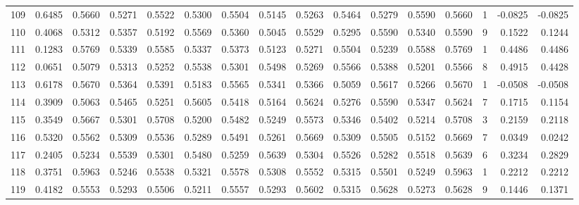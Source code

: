 \begin{tabular}{lrrrrrrrrrrrrrrr}
109 &      0.6485 &  0.5660 &  0.5271 &  0.5522 &  0.5300 &  0.5504 &  0.5145 &  0.5263 &  0.5464 &  0.5279 &   0.5590 &     0.5660 &      1 &                   -0.0825 &                    -0.0825 \\
110 &      0.4068 &  0.5312 &  0.5357 &  0.5192 &  0.5569 &  0.5360 &  0.5045 &  0.5529 &  0.5295 &  0.5590 &   0.5340 &     0.5590 &      9 &                    0.1522 &                     0.1244 \\
111 &      0.1283 &  0.5769 &  0.5339 &  0.5585 &  0.5337 &  0.5373 &  0.5123 &  0.5271 &  0.5504 &  0.5239 &   0.5588 &     0.5769 &      1 &                    0.4486 &                     0.4486 \\
112 &      0.0651 &  0.5079 &  0.5313 &  0.5252 &  0.5538 &  0.5301 &  0.5498 &  0.5269 &  0.5566 &  0.5388 &   0.5201 &     0.5566 &      8 &                    0.4915 &                     0.4428 \\
113 &      0.6178 &  0.5670 &  0.5364 &  0.5391 &  0.5183 &  0.5565 &  0.5341 &  0.5366 &  0.5059 &  0.5617 &   0.5266 &     0.5670 &      1 &                   -0.0508 &                    -0.0508 \\
114 &      0.3909 &  0.5063 &  0.5465 &  0.5251 &  0.5605 &  0.5418 &  0.5164 &  0.5624 &  0.5276 &  0.5590 &   0.5347 &     0.5624 &      7 &                    0.1715 &                     0.1154 \\
115 &      0.3549 &  0.5667 &  0.5301 &  0.5708 &  0.5200 &  0.5482 &  0.5249 &  0.5573 &  0.5346 &  0.5402 &   0.5214 &     0.5708 &      3 &                    0.2159 &                     0.2118 \\
116 &      0.5320 &  0.5562 &  0.5309 &  0.5536 &  0.5289 &  0.5491 &  0.5261 &  0.5669 &  0.5309 &  0.5505 &   0.5152 &     0.5669 &      7 &                    0.0349 &                     0.0242 \\
117 &      0.2405 &  0.5234 &  0.5539 &  0.5301 &  0.5480 &  0.5259 &  0.5639 &  0.5304 &  0.5526 &  0.5282 &   0.5518 &     0.5639 &      6 &                    0.3234 &                     0.2829 \\
118 &      0.3751 &  0.5963 &  0.5246 &  0.5538 &  0.5321 &  0.5578 &  0.5308 &  0.5552 &  0.5315 &  0.5501 &   0.5249 &     0.5963 &      1 &                    0.2212 &                     0.2212 \\
119 &      0.4182 &  0.5553 &  0.5293 &  0.5506 &  0.5211 &  0.5557 &  0.5293 &  0.5602 &  0.5315 &  0.5628 &   0.5273 &     0.5628 &      9 &                    0.1446 &                     0.1371 \\

\end{tabular}
